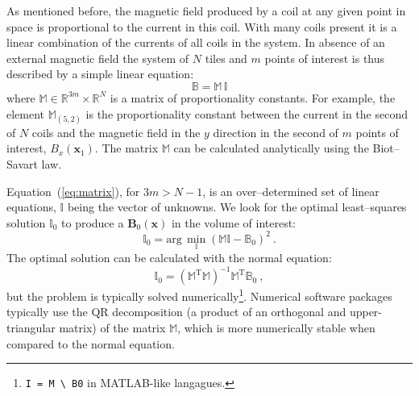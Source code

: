 
As mentioned before, the magnetic field produced by a coil at any given point in space is proportional to the current in this coil. With many coils present it is a linear combination of the currents of all coils in the system. In absence of an external magnetic field the system of $N$ tiles and $m$ points of interest is thus described by a simple linear equation:
\begin{equation}
  \label{eq:matrix}
  \mathbb{B} = \mathbb{M} \, \mathbb{I}
\end{equation}
where $\mathbb{M} \in \mathbb{R}^{3 m} \times \mathbb{R}^{N}$ is a matrix of proportionality constants. For example, the element $\mathbb{M}_{(5, 2)}$ is the proportionality constant between the current in the second of $N$ coils and the magnetic field in the $y$ direction in the second of $m$ points of interest, $B_x(\mathbf{x}_1)$. The matrix $\mathbb{M}$ can be calculated analytically using the Biot--Savart law.

Equation~(\ref{eq:matrix}), for $3m > N - 1$, is an over--determined set of linear equations, $\mathbb{I}$ being the vector of unknowns. We look for the optimal least--squares solution $\mathbb{I}_0$ to produce a $\mathbf{B}_0(\mathbf{x})$ in the volume of interest:
\begin{equation}
  \label{eq:requirement}
  \mathbb{I}_0 = \mathrm{arg}\,\min_{\mathbb{I}} \left( \mathbb{M} \mathbb{I} - \mathbb{B}_0 \right)^2 \ .
\end{equation}
The optimal solution can be calculated with the normal equation:
\begin{equation}
  \mathbb{I}_0 = \left( \mathbb{M}^\mathrm{T} \mathbb{M} \right)^{-1} \mathbb{M}^\mathrm{T} \mathbb{B}_0 \ ,
\end{equation}
but the problem is typically solved numerically\footnote{\texttt{I = M \textbackslash{} B0} in MATLAB-like langagues.}. Numerical software packages typically use the QR decomposition (a product of an orthogonal and upper-triangular matrix) of the matrix $\mathbb{M}$, which is more numerically stable when compared to the normal equation.

